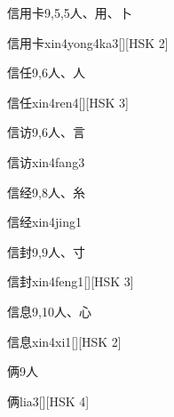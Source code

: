 \begin{entry}{信用卡}{9,5,5}{⼈、⽤、⼘}
  \begin{phonetics}{信用卡}{xin4yong4ka3}[][HSK 2]
  \end{phonetics}
\end{entry}

\begin{entry}{信任}{9,6}{⼈、⼈}
  \begin{phonetics}{信任}{xin4ren4}[][HSK 3]
  \end{phonetics}
\end{entry}

\begin{entry}{信访}{9,6}{⼈、⾔}
  \begin{phonetics}{信访}{xin4fang3}
  \end{phonetics}
\end{entry}

\begin{entry}{信经}{9,8}{⼈、⽷}
  \begin{phonetics}{信经}{xin4jing1}
  \end{phonetics}
\end{entry}

\begin{entry}{信封}{9,9}{⼈、⼨}
  \begin{phonetics}{信封}{xin4feng1}[][HSK 3]
  \end{phonetics}
\end{entry}

\begin{entry}{信息}{9,10}{⼈、⼼}
  \begin{phonetics}{信息}{xin4xi1}[][HSK 2]
  \end{phonetics}
\end{entry}

\begin{entry}{俩}{9}{⼈}
  \begin{phonetics}{俩}{lia3}[][HSK 4]
  \end{phonetics}
\end{entry}

